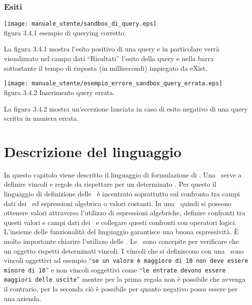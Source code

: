 \begin{center}
\subsection{Esiti}
\begin{center}
\texttt{[image: manuale\_utente/sandbox\_di\_query.eps]}\\
 figura 3.4.1 esempio di querying corretto.
\end{center}
La figura 3.4.1 mostra l'esito positivo di una query e in particolare verr\`a visualizzato nel campo dati ``Risultati'' l'esito della query e nella barra sottostante il tempo di risposta (in millisecondi) impiegato da eXist.

\begin{center}
\texttt{[image: manuale\_utente/esempio\_errore\_sandbox\_query\_errata.eps]}\\
figura 3.4.2 Inserimento query errata.
\end{center}
La figura 3.4.2 mostra un'eccezione lanciata in caso di esito negativo di una query scritta in maniera errata.


\chapter{Descrizione del linguaggio}
In questo capitolo viene descritto il linguaggio di formulazione di \br. Una \br\ serve a definire vincoli e regole da rispettare per un determinato \bo. Per questo il linguaggio di definizione delle \br\ \`e incentrato soprattutto sul confronto tra campi dati dei \bo\ ed espressioni algebrica o valori costanti. In una \br\ quindi si possono ottenere valori attraverso l'utilizzo di espressioni algebriche, definire confronti tra questi valori e campi dati dei \bo\ e collegare questi confronti con operatori logici. L'insieme delle funzionalit\`a del linguaggio garantisce una buona espressivit\`a.
\`E molto importante chiarire l'utilizzo delle \br. Le \br\ sono concepite per verificare che un oggetto rispetti determinati vincoli. I vincoli che si definiscono con una \br\ sono vincoli oggettivi ad esempio ``\texttt{se un valore è maggiore di 10 non deve essere minore di 10}'' e non vincoli soggettivi come ``\texttt{le entrate devono essere maggiori delle uscite}'' mentre per la prima regola non \`e possibile che avvenga il contrario, per la seconda ci\`o \`e possibile per quanto negativo possa essere per una azienda.


\end{center}
